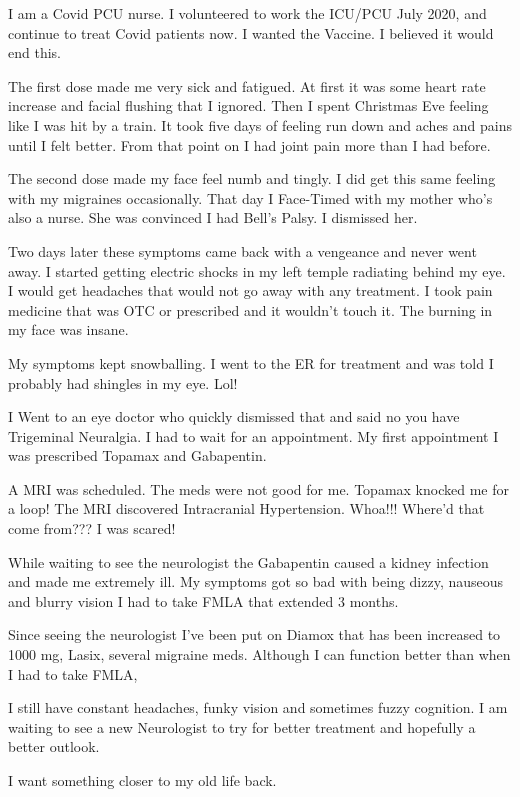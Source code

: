 I am a Covid PCU nurse. I volunteered to work the ICU/PCU July 2020, and
continue to treat Covid patients now. I wanted the Vaccine. I believed it would
end this.

The first dose made me very sick and fatigued. At first it was some heart rate
increase and facial flushing that I ignored. Then I spent Christmas Eve feeling
like I was hit by a train. It took five days of feeling run down and aches and
pains until I felt better. From that point on I had joint pain more than I had
before.

The second dose made my face feel numb and tingly. I did get this same feeling
with my migraines occasionally. That day I Face-Timed with my mother who’s also
a nurse. She was convinced I had Bell’s Palsy. I dismissed her.

Two days later these symptoms came back with a vengeance and never went away. I
started getting electric shocks in my left temple radiating behind my eye. I
would get headaches that would not go away with any treatment. I took pain
medicine that was OTC or prescribed and it wouldn’t touch it. The burning in my
face was insane.

My symptoms kept snowballing. I went to the ER for treatment and was told I
probably had shingles in my eye. Lol!

I Went to an eye doctor who quickly dismissed that and said no you have
Trigeminal Neuralgia. I had to wait for an appointment. My first appointment I
was prescribed Topamax and Gabapentin.

A MRI was scheduled. The meds were not good for me. Topamax knocked me for a
loop! The MRI discovered Intracranial Hypertension. Whoa!!! Where’d that come
from??? I was scared!

While waiting to see the neurologist the Gabapentin caused a kidney infection
and made me extremely ill. My symptoms got so bad with being dizzy, nauseous and
blurry vision I had to take FMLA that extended 3 months.

Since seeing the neurologist I’ve been put on Diamox that has been increased to
1000 mg, Lasix, several migraine meds. Although I can function better than when
I had to take FMLA,

I still have constant headaches, funky vision and sometimes fuzzy cognition. I
am waiting to see a new Neurologist to try for better treatment and hopefully a
better outlook.

I want something closer to my old life back.

